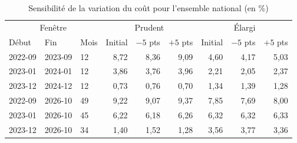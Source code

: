 \begin{table}[!htbp]
\centering\small
\setlength{\tabcolsep}{4pt}
\caption{Sensibilité de la variation du coût pour l'ensemble national (en \%)}\label{tab:robustesse-histoire}
\begin{tabular}{lllrrrrrr}
\hline
\multicolumn{3}{c}{Fenêtre} & \multicolumn{3}{c}{Prudent} & \multicolumn{3}{c}{Élargi} \\
Début & Fin & Mois & Initial & $-5$ pts & $+5$ pts & Initial & $-5$ pts & $+5$ pts \\
\hline
2022-09 & 2023-09 & 12 & 8{,}72 & 8{,}36 & 9{,}09 & 4{,}60 & 4{,}17 & 5{,}03 \\
2023-01 & 2024-01 & 12 & 3{,}86 & 3{,}76 & 3{,}96 & 2{,}21 & 2{,}05 & 2{,}37 \\
2023-12 & 2024-12 & 12 & 0{,}73 & 0{,}76 & 0{,}70 & 1{,}34 & 1{,}39 & 1{,}28 \\
\hline
2022-09 & 2026-10 & 49 & 9{,}22 & 9{,}07 & 9{,}37 & 7{,}85 & 7{,}69 & 8{,}00 \\
2023-01 & 2026-10 & 45 & 6{,}22 & 6{,}18 & 6{,}26 & 6{,}32 & 6{,}32 & 6{,}33 \\
2023-12 & 2026-10 & 34 & 1{,}40 & 1{,}52 & 1{,}28 & 3{,}56 & 3{,}77 & 3{,}36 \\
\hline
\end{tabular}
\end{table}

